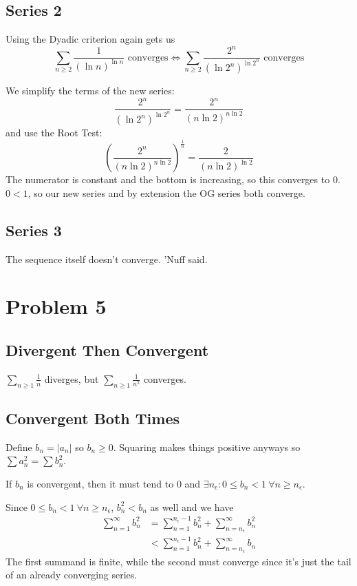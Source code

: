 \documentclass[12pt]{article}
\begin{document}
\subsection{Series 2}

Using the Dyadic criterion again gets us
\[\sum_{n \ge 2} \frac{1}{(\ln n)^{\ln n}}\text{ converges} \iff \sum_{n \ge 2} \frac{2^n}{(\ln 2^n)^{\ln 2^n}}\text{ converges}\]

We simplify the terms of the new series:
\[\frac{2^n}{(\ln 2^n)^{\ln 2^n}} = \frac{2^n}{(n \ln 2)^{n \ln 2}}\]
and use the Root Test:
\[\left(\frac{2^n}{(n \ln 2)^{n \ln 2}}\right)^{\frac{1}{n}} = \frac{2}{(n \ln 2)^{\ln 2}}\]
The numerator is constant and the bottom is increasing, so this converges to $0$.
$0 < 1$, so our new series and by extension the OG series both converge.

\subsection{Series 3}

The sequence itself doesn't converge. 'Nuff said.

\section{Problem 5}

\subsection{Divergent Then Convergent}

$\sum_{n \ge 1} \frac{1}{n}$ diverges, but $\sum_{n \ge 1} \frac{1}{n^2}$ converges.

\subsection{Convergent Both Times}

Define $b_n=|a_n|$ so $b_n \ge 0$.
Squaring makes things positive anyways so $\sum a_n^2=\sum b_n^2$.

If $b_n$ is convergent, then it must tend to $0$
and $\exists n_\epsilon: 0 \le b_n < 1\ \forall n \ge n_\epsilon$.

Since $0 \le b_n < 1\ \forall n \ge n_\epsilon$, $b_n^2 < b_n$ as well and we have
\begin{align*}
  \sum_{n=1}^{\infty} b_n^2
   & = \sum_{n=1}^{n_\epsilon-1} b_n^2 + \sum_{n=n_\epsilon}^{\infty} b_n^2 \\
   & < \sum_{n=1}^{n_\epsilon-1} b_n^2 + \sum_{n=n_\epsilon}^{\infty} b_n
\end{align*}
The first summand is finite, while the second
must converge since it's just the tail of an already converging series.
\end{document}
